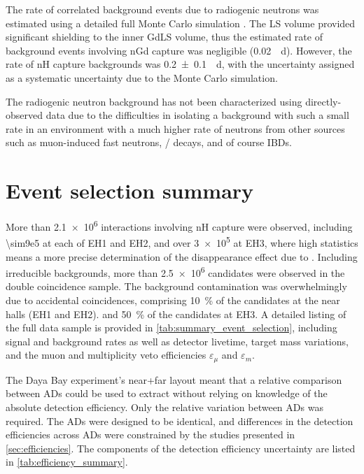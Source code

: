 The rate of correlated background events due to radiogenic neutrons
was estimated using a detailed full Monte Carlo simulation \cite{rad_n}.
The LS volume provided significant shielding to the inner GdLS volume,
thus the estimated rate of background events involving nGd capture
was negligible (\SI{0.02}{\per\day}).
However, the rate of nH capture backgrounds was \SI{0.2\pm0.1}{\per\day},
with the uncertainty assigned as a systematic uncertainty
due to the Monte Carlo simulation.

The radiogenic neutron background has not been characterized
using directly-observed data
due to the difficulties in isolating a background with such a small rate
in an environment with a much higher rate of neutrons from other sources
such as muon-induced fast neutrons, \li{}/\he{} decays, and of course IBDs.

\section{Event selection summary}
\label{sec:event_selection_summary}

More than \num{2.1e6} \nuebar{} interactions involving nH capture were observed,
including \num{\sim9e5} at each of EH1 and EH2,
and over \num{3e5} at EH3, where high statistics means
a more precise determination of the disappearance effect due to \thetaot{}.
Including irreducible backgrounds, more than \num{2.5e6}
\nuebar{} candidates were observed in the double coincidence sample.
The background contamination was overwhelmingly due to accidental coincidences,
comprising \SI{10}{\percent} of the \nuebar{} candidates
at the near halls (EH1 and EH2).
and \SI{50}{\percent} of the \nuebar{} candidates at EH3.
A detailed listing of the full data sample is provided in
\cref{tab:summary_event_selection},
including signal and background rates
as well as detector livetime, target mass variations,
and the muon and multiplicity veto efficiencies $\varepsilon_\mu$ and $\varepsilon_m$.

The Daya Bay experiment's near+far layout meant that a relative comparison
between ADs could be used to extract \thetaot{}
without relying on knowledge of the absolute detection efficiency.
Only the relative variation between ADs was required.
The ADs were designed to be identical,
and differences in the detection efficiencies across ADs
were constrained by the studies presented in \cref{sec:efficiencies}.
The components of the detection efficiency uncertainty
are listed in \cref{tab:efficiency_summary}.

